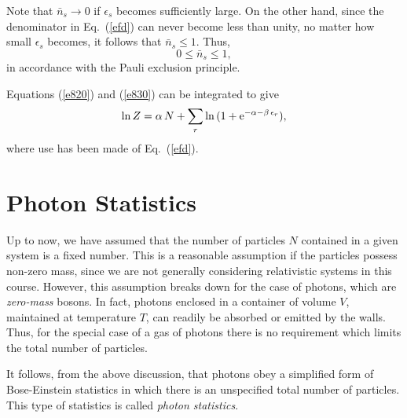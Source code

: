 Note that $\bar{n}_s\rightarrow 0$ if $\epsilon_s$ becomes sufficiently 
large.
On the other hand, since the denominator in Eq.~(\ref{efd}) can never become
less than unity, no matter how small $\epsilon_s$ becomes, it follows
that $\bar{n}_s\leq 1$. Thus,
\begin{equation} 
0 \leq \bar{n}_s \leq 1,
\end{equation}
in accordance with the Pauli exclusion principle.

Equations (\ref{e820}) and (\ref{e830}) can be integrated to
give
\begin{equation}
\ln Z = \alpha\,N + \sum_r\ln \,(1+{\rm e}^{-\alpha-\beta\,\epsilon_r}),
\end{equation}
where use has been made of Eq.~(\ref{efd}).

\section{Photon Statistics}
Up to now, we have assumed that the number of particles $N$ contained
in a given system is a fixed
number. This is a reasonable assumption if the particles possess non-zero
mass, since we are not generally considering 
relativistic systems in this  course.
However, this assumption breaks down for the case of photons, which are
{\em zero-mass}\/ bosons. In fact,   photons enclosed in a container
of volume $V$, maintained at temperature $T$, can readily be absorbed
or emitted by the walls. Thus, for the special case of a gas of
photons there is no requirement which limits the total number of particles.

It follows, from the above discussion, that photons obey a simplified
form of Bose-Einstein statistics in which there is an unspecified
total number of particles. This type of statistics is called {\em photon
statistics}.

